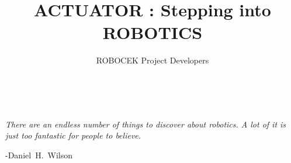 \documentclass{tufte-book} %
\title{ACTUATOR : Stepping into ROBOTICS} %
\author{ROBOCEK Project Developers} %
\begin{document}
\frontmatter

\maketitle %




\let\cleardoublepage\clearpage 

\begin{spacing}{0.80}
    \tableofcontents %
\end{spacing}

\let\cleardoublepage\clearpage 

\listoffigures %
\listoftables
\printacronyms
\newpage

\cleardoublepage
~\vfill
\begin{fullwidth}
    \noindent\fontsize{18}{22}\selectfont\itshape \nohyphenation
    There are an endless number of things to discover about robotics. A lot of it is just too fantastic for people to believe.
    \par \begin{flushright} \mbox{-Daniel H. Wilson} \end{flushright} 
\end{fullwidth}
\vfill \vfill

\mainmatter


\end{document}
